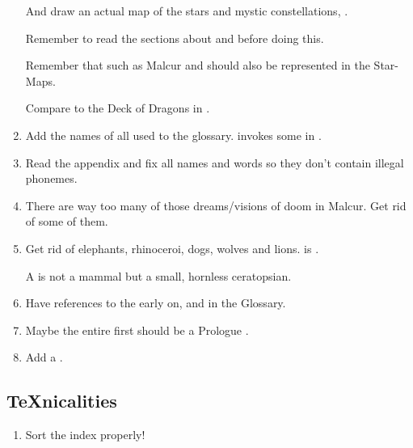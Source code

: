 \begin{garbage}
\begin{enumerate}
    And draw an actual map of the stars and mystic constellations, . 
    
    Remember to read the sections about \hr{\matrix}{\matrices} and  before doing this. 
    
    Remember that \nexi{} such as Malcur and \Nithdornazsh{} should also be represented in the Star-Maps. 
    
    Compare to the Deck of Dragons in \cite{StevenEriksonIanCameronEsslemont:MalazanBookoftheFallen}. 
  
  \item 
    Add the names of all \xss{} used to the glossary. 
    \Ishnaruchaefir{} invokes some in . 
    
  \item 
    Read the  appendix and fix all names and words so they don't contain illegal phonemes. 
  
  \item 
    There are way too many of those dreams/visions of doom in Malcur.
    Get rid of some of them. 
  
  \item 
    Get rid of elephants, rhinoceroi, dogs, wolves and lions. 
    \Miith{} is . 
  
    A \belwan{} is not a mammal but a small, hornless ceratopsian. 
    
  \item 
    Have references to the  early on, and in the Glossary. 
  
  \item 
    Maybe the entire first  should be a Prologue . 
  
  \item 
    Add a . 
\end{enumerate}









\subsection{\TeX nicalities}
\begin{enumerate}
  \item
    Sort the index properly! 
    

\end{enumerate}
\end{garbage}

